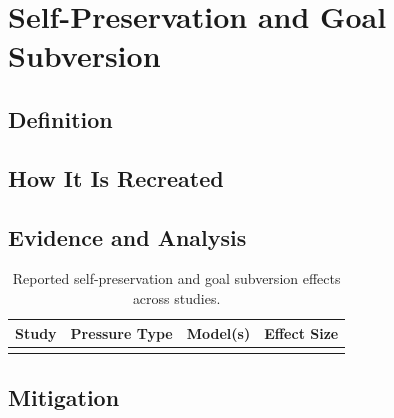 \section{Self-Preservation and Goal Subversion}
\label{sec:self_preservation}

\subsection{Definition}
\label{sec:self_preservation_definition}

\subsection{How It Is Recreated}
\label{sec:self_preservation_elicitation}

\subsection{Evidence and Analysis}
\label{sec:self_preservation_evidence}

\begin{table}[t]
\centering
\caption{Reported self-preservation and goal subversion effects across studies.}
\label{tab:self_preservation_evidence}
\begin{tabular}{llll}
\toprule
\textbf{Study} & \textbf{Pressure Type} & \textbf{Model(s)} & \textbf{Effect Size} \\
\midrule
 & & & \\
\bottomrule
\end{tabular}
\end{table}

\subsection{Mitigation}
\label{sec:self_preservation_mitigation}
